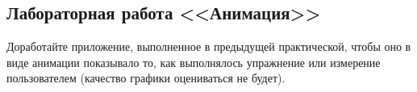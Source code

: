 \subsection{Лабораторная работа <<Анимация>>}

Доработайте приложение, выполненное в предыдущей практической, чтобы оно в виде анимации показывало то, 
как выполнялось упражнение или измерение пользователем (качество графики оцениваться не будет).


